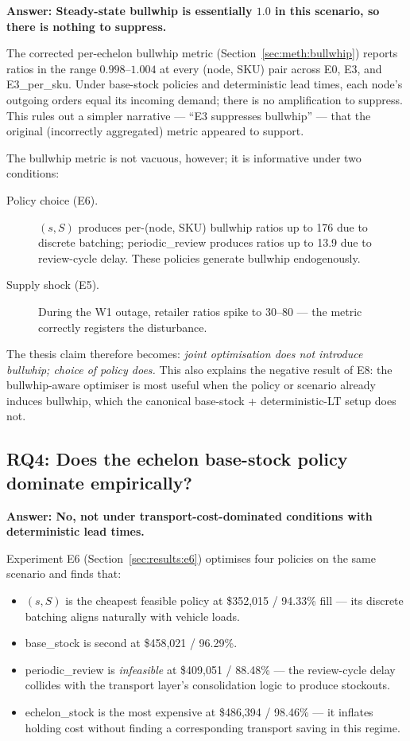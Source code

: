 \textbf{Answer: Steady-state bullwhip is essentially $1.0$ in this
scenario, so there is nothing to suppress.}

The corrected per-echelon bullwhip metric
(Section~\ref{sec:meth:bullwhip}) reports ratios in the range
$0.998$--$1.004$ at every (node, SKU) pair across E0, E3, and
E3\_per\_sku.  Under base-stock policies and deterministic lead times,
each node's outgoing orders equal its incoming demand; there is no
amplification to suppress.  This rules out a simpler narrative — ``E3
suppresses bullwhip'' — that the original (incorrectly aggregated)
metric appeared to support.

The bullwhip metric is not vacuous, however; it is informative under
two conditions:

\begin{description}
  \item[Policy choice (E6).] $(s,S)$ produces per-(node, SKU) bullwhip
        ratios up to 176 due to discrete batching;
        periodic\_review produces ratios up to 13.9 due to review-cycle
        delay.  These policies generate bullwhip endogenously.
  \item[Supply shock (E5).] During the W1 outage, retailer ratios spike
        to 30--80 — the metric correctly registers the disturbance.
\end{description}

The thesis claim therefore becomes: \emph{joint optimisation does not
introduce bullwhip; choice of policy does.}  This also explains the
negative result of E8: the bullwhip-aware optimiser is most useful when
the policy or scenario already induces bullwhip, which the canonical
base-stock + deterministic-LT setup does not.

\subsection{RQ4: Does the echelon base-stock policy dominate empirically?}

\textbf{Answer: No, not under transport-cost-dominated conditions with
deterministic lead times.}

Experiment E6 (Section~\ref{sec:results:e6}) optimises four policies on
the same scenario and finds that:

\begin{itemize}
  \item $(s,S)$ is the cheapest feasible policy at \$352,015 / 94.33\%
        fill — its discrete batching aligns naturally with vehicle
        loads.
  \item base\_stock is second at \$458,021 / 96.29\%.
  \item periodic\_review is \emph{infeasible} at \$409,051 / 88.48\% —
        the review-cycle delay collides with the transport layer's
        consolidation logic to produce stockouts.
  \item echelon\_stock is the most expensive at \$486,394 / 98.46\% —
        it inflates holding cost without finding a corresponding
        transport saving in this regime.
\end{itemize}


